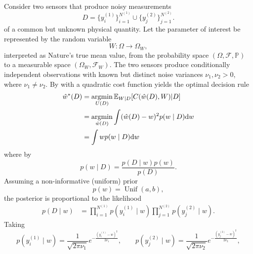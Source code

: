 \begin{example}
	\label{ex:heteroscedastic_bayes}
	Consider two sensors that produce noisy measurements
	\begin{equation}
		D = \{ y_i^{(1)} \}_{i=1}^{N^{(1)}} \cup \{ y_j^{(2)} \}_{j=1}^{N^{(2)}}.
	\end{equation}
	of a common but unknown physical quantity. Let the parameter of interest be represented by the random variable
	\begin{equation}
		W\colon \Omega \to \Omega_W,
	\end{equation}
	interpreted as Nature’s true mean value, from the probability space $(\Omega, \mathcal{F}, \mathbb{P})$ to a measurable space $(\Omega_W,\mathcal{F}_W)$. The two sensors produce conditionally independent observations with known but distinct noise variances $\nu_1, \nu_2 > 0$, where $\nu_1 \neq \nu_2$. By  with a quadratic cost function yields the optimal decision rule 
	\begin{equation}
		\begin{split}
			\hat{w}^*(D) &=\operatorname*{argmin}_{U(D)}\mathbb{E}_{W|D}[C(\hat{w}(D), W)|D]\\
			&= \operatorname*{argmin}_{\hat{w}(D)}\int (\hat{w}(D) - w)^2p(w\mid D) \mathrm{d}w \\
			&= \int w p(w\mid D) \mathrm{d}w
		\end{split}
		\label{eq:deci}
	\end{equation}
	where by 
	\begin{equation}
		p(w \mid D)
		= \frac{p(D \mid w)p(w)}
		{p(D)}.
		\label{eq:hetero_posterior}
	\end{equation}
	Assuming a non-informative (uniform) prior 
	\begin{equation}
		p(w) = \operatorname{Unif}(a,b),
	\end{equation}
	the posterior is proportional to the likelihood
	\begin{equation}
		\begin{split}
			p(D \mid w)
			&= \prod_{i=1}^{N^{(1)}} p(y_i^{(1)}\mid w)
			\prod_{j=1}^{N^{(2)}} p(y_j^{(2)}\mid w).
		\end{split}
	\end{equation}
	Taking 
	\begin{equation}
		p(y_i^{(1)}\mid w) = \frac{1}{\sqrt{2\pi\nu_1}}
		e^{-\frac{(y_i^{(1)} - w)^2}{2\nu_1}},
		\qquad
		p(y_j^{(2)}\mid w) = \frac{1}{\sqrt{2\pi\nu_2}}
		e^{-\frac{(y_j^{(2)} - w)^2}{2\nu_2}},
	\end{equation}

\end{example}
